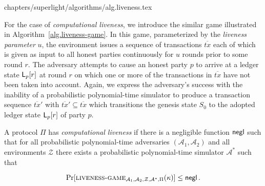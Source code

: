 {chapters/superlight/algorithms/alg.liveness.tex}

For the case of \emph{computational liveness}, we introduce the similar game
illustrated in Algorithm~\ref{alg.liveness-game}. In this game, parameterized by
the \emph{liveness parameter} $u$, the environment issues a sequence of
transactions $\overline{tx}$ each of which is given as input to all honest
parties continuously for $u$ rounds prior to some round $r$. The adversary
attempts to cause an honest party $p$ to arrive at a ledger state $\mathsf{L}_p[r]$
at round $r$ on which one or more of the transactions in $\overline{tx}$ have
not been taken into account. Again, we express the adversary's success with the
inability of a probabilistic polynomial-time simulator to produce a transaction
sequence $\overline{tx}'$ with $\overline{tx}' \subseteq \overline{tx}$ which
transitions the genesis state $S_0$ to the adopted ledger state $\mathsf{L}_p[r]$
of party $p$.

\begin{definition}
  A protocol $\Pi$ has \emph{computational liveness} if there is a negligible
  function $\mathsf{negl}$ such that for all probabilistic
  polynomial-time adversaries $(\mathcal{A}_1, \mathcal{A}_2)$ and all environments $\mathcal{Z}$
  there exists a probabilistic
  polynomial-time simulator $\mathcal{A}^*$ such that

  \[
  \Pr[\textsc{liveness}\textsc{-}\textsc{game}_{\mathcal{A}_1,\mathcal{A}_2,\mathcal{Z},\mathcal{A}^*,\Pi}(\kappa)]
  \leq \mathsf{negl}
  \,.
  \]
\end{definition}
